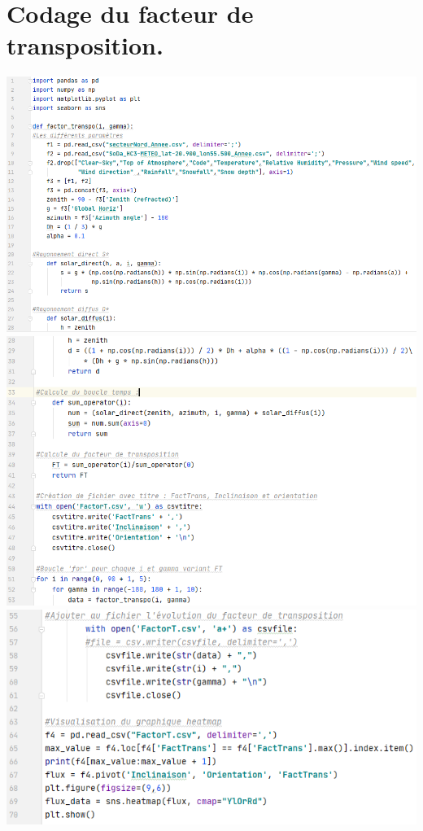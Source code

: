 \documentclass[12pt,a4paper,openright]{report}
\begin{document}
\chapter{Codage du facteur de transposition.}
\includegraphics[scale=0.5]{prog1}
\newline
\includegraphics[scale=0.5]{prog2}
\newpage
\includegraphics[scale=0.5]{prog3}
\end{document}
